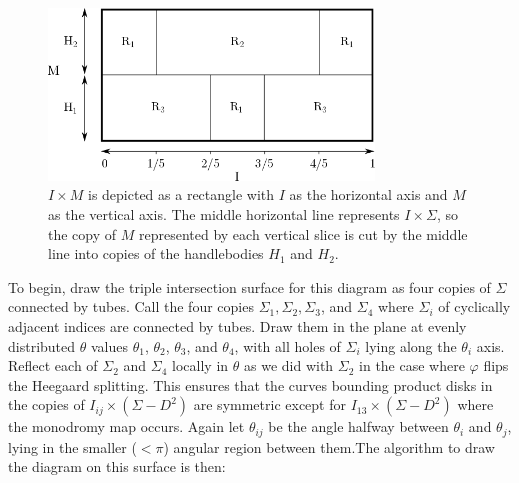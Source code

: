 \documentclass[12pt]{amsart}
\theoremstyle{definition}
\theoremstyle{remark}
\begin{document}
\begin{figure}[h]
\centering
\includegraphics[height=1.8in]{MxS1_unbalanced.png}
\caption{$I \times M$ is depicted as a rectangle with $I$ as the horizontal axis and $M$ as the vertical axis.
The middle horizontal line represents $I \times \Sigma$, so the copy of $M$ represented by each vertical slice is cut by the middle line into copies of the handlebodies $H_1$ and $H_2$.}
\label{unbalancedbreakdown}
\end{figure}

To begin, draw the triple intersection surface for this diagram as four copies of $\Sigma$ connected by tubes.
Call the four copies $\Sigma_1, \Sigma_2, \Sigma_3$, and $\Sigma_4$ where $\Sigma_i$ of cyclically adjacent indices are connected by tubes.
Draw them in the plane at evenly distributed $\theta$ values $\theta_1$, $\theta_2$, $\theta_3$, and $\theta_4$, with all holes of $\Sigma_i$ lying along the $\theta_i$ axis.
Reflect each of $\Sigma_2$ and $\Sigma_4$ locally in $\theta$ as we did with $\Sigma_2$ in the case where $\varphi$ flips the Heegaard splitting.
This ensures that the curves bounding product disks in the copies of $I_{ij} \times (\Sigma - D^2)$ are symmetric except for $I_{13} \times (\Sigma - D^2)$ where the monodromy map occurs.
Again let $\theta_{ij}$ be the angle halfway between $\theta_i$ and $\theta_j$, lying in the smaller ($< \pi$) angular region between them.The algorithm to draw the diagram on this surface is then:
\end{document}
